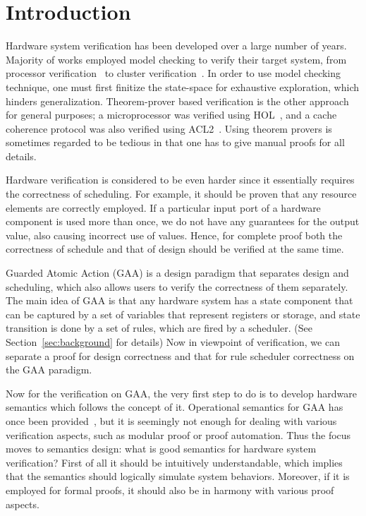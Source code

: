 \section{Introduction}
Hardware system verification has been developed over a large number of
years. Majority of works employed model checking to verify their
target system, from processor verification~\cite{ProcVerif1,
  ProcVerif2} to cluster verification~\cite{ClusterVerif}. In order to
use model checking technique, one must first finitize the state-space
for exhaustive exploration, which hinders generalization.
Theorem-prover based verification is the other approach for general
purposes; a microprocessor was verified using HOL~\cite{MicroVerif},
and a cache coherence protocol was also verified using
ACL2~\cite{CCVerif}. Using theorem provers is sometimes regarded to be
tedious in that one has to give manual proofs for all details.

Hardware verification is considered to be even harder since it
essentially requires the correctness of scheduling. For example, it
should be proven that any resource elements are correctly employed. If
a particular input port of a hardware component is used more than
once, we do not have any guarantees for the output value, also causing
incorrect use of values. Hence, for complete proof both the
correctness of schedule and that of design should be verified at the
same time.

Guarded Atomic Action (GAA) is a design paradigm that separates design
and scheduling, which also allows users to verify the correctness of
them separately. The main idea of GAA is that any hardware system has
a state component that can be captured by a set of variables that
represent registers or storage, and state transition is done by a set
of rules, which are fired by a scheduler. (See
Section~\ref{sec:background} for details) Now in viewpoint of
verification, we can separate a proof for design correctness and that
for rule scheduler correctness on the GAA paradigm.

Now for the verification on GAA, the very first step to do is to
develop hardware semantics which follows the concept of it.
Operational semantics for GAA has once been provided~\cite{SemGAA},
but it is seemingly not enough for dealing with various verification
aspects, such as modular proof or proof automation. Thus the focus
moves to semantics design: what is good semantics for hardware system
verification? First of all it should be intuitively understandable,
which implies that the semantics should logically simulate system
behaviors. Moreover, if it is employed for formal proofs, it should
also be in harmony with various proof aspects.

